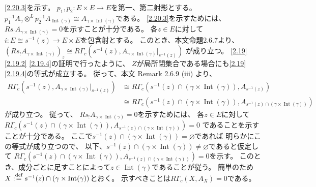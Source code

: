 \documentclass[uplatex,dvipdfmx]{jsarticle}
\makeatletter
\theoremstyle{definition}
\renewenvironment{proof}[1][\proofname]{
  \pushQED{\qed}%
  \normalfont \topsep6\p@\@plus6\p@\relax
  \trivlist
  \item[\hskip\labelsep
    #1\@addpunct{\textbf{.}}]\ignorespaces
}{%
  \popQED\endtrivlist\@endpefalse
}
\providecommand{\proofname}{証明}
\DeclareMathOperator{\Int}{\mathrm{Int}}
\renewcommand{\emptyset}{\varnothing}
\def\dfn{:\overset{\mbox{{\scriptsize def}}}{=}}
\makeatother
\begin{document}
\begin{proof}
  \ref{2.20.3}を示す。
  \(p_1,p_2:E\times E\to E\)を第一、第二射影とする。
  \(p_1^{-1}A_{\gamma}\otimes^L p_2^{-1}A_{\Int(\gamma)}
  \cong A_{\gamma\times \Int(\gamma)}\)である。
  \ref{2.20.3}を示すためには、
  \(Rs_!A_{\gamma\times \Int(\gamma)} = 0\)を示すことが十分である。
  各\(z\in E\)に対して
  \(i:E\cong s^{-1}(z) \to E\times E\)を包含射とする。
  このとき、本文命題2.6.7より、
  \((Rs_!A_{\gamma\times \Int(\gamma)})_z \cong
  R\Gamma_c(s^{-1}(z), A_{\gamma\times \Int(\gamma)}|_{s^{-1}(z)})\)
  が成り立つ。
  \autoref{2.19} \eqref{2.19.2} \eqref{2.19.4}の証明で行ったように、
  \(Z\)が局所閉集合である場合にも\autoref{2.19} \eqref{2.19.4}の等式が成立する。
  従って、本文 Remark 2.6.9 (iii) より、
  \begin{align*}
    R\Gamma_c(s^{-1}(z), A_{\gamma\times \Int(\gamma)}|_{s^{-1}(z)}) &\cong
    R\Gamma_c(s^{-1}(z)\cap (\gamma\times \Int(\gamma)), A_{s^{-1}(z)}) \\
    &\cong R\Gamma_c(s^{-1}(z)\cap (\gamma\times \Int(\gamma)),
    A_{s^{-1}(z)\cap (\gamma\times \Int(\gamma))})
  \end{align*}
  が成り立つ。
  従って、
  \(Rs_!A_{\gamma\times \Int(\gamma)} = 0\)を示すためには、
  各\(z\in E\)に対して
  \(R\Gamma_c(s^{-1}(z)\cap (\gamma\times \Int(\gamma)),
  A_{s^{-1}(z)\cap (\gamma\times \Int(\gamma))}) = 0\)
  であることを示すことが十分である。
  ここで\(s^{-1}(z)\cap (\gamma\times \Int(\gamma)) = \emptyset\)であれば
  明らかにこの等式が成り立つので、
  以下、\(s^{-1}(z)\cap (\gamma\times \Int(\gamma)) \neq \emptyset\)であると仮定して
  \(R\Gamma_c(s^{-1}(z)\cap (\gamma\times \Int(\gamma)),
  A_{s^{-1}(z)\cap (\gamma\times \Int(\gamma))}) = 0\)を示す。
  このとき、成分ごとに足すことによって\(z\in \Int(\gamma)\)であることが従う。
  簡単のため
  \(X \dfn s^{-1}(z)\cap (\gamma\times \Int(\gamma))\)とおく。
  示すべきことは\(R\Gamma_c(X,A_X)=0\)である。


\end{proof}
\end{document}
